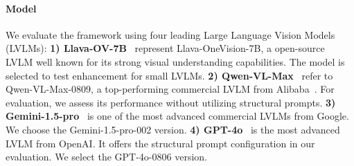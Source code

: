 \paragraph{Model}
We evaluate the \lavid framework using four leading Large Language Vision Models (LVLMs):
\textbf{1) Llava-OV-7B}~\cite{li2024llavaonevisioneasyvisualtask} represent Llava-OneVision-7B, a open-source LVLM well known for its strong visual understanding capabilities. The model is selected to test \lavid enhancement for small LVLMs.
\textbf{2) Qwen-VL-Max}~\cite{qwen2023qwenvl} refer to Qwen-VL-Max-0809, a top-performing commercial LVLM from Alibaba~\cite{alibaba}. For evaluation, we assess its performance without utilizing structural prompts.
\textbf{3) Gemini-1.5-pro}~\cite{google2024gemini} is one of the most advanced commercial LVLMs from Google. We choose the Gemini-1.5-pro-002 version.
\textbf{4) GPT-4o}~\cite{openai2024gpt4o} is the most advanced LVLM from OpenAI. It offers the structural prompt configuration in our evaluation. We select the GPT-4o-0806 version.

